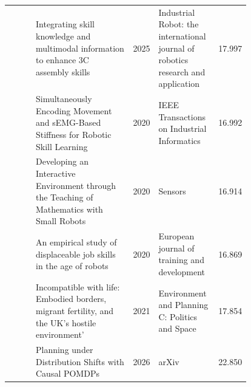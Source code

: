 \documentclass{article}
\begin{document}
\begin{center}
\begin{longtable}{p{0.12\linewidth}p{0.42\linewidth}cp{0.25\linewidth}c}
\citep{pool83_23} & Integrating skill knowledge and multimodal information to enhance 3C assembly skills & 2025 & Industrial Robot: the international journal of robotics research and application & 17.997\\
\citep{pool83_24} & Simultaneously Encoding Movement and sEMG-Based Stiffness for Robotic Skill Learning & 2020 & IEEE Transactions on Industrial Informatics & 16.992\\
\citep{pool83_25} & Developing an Interactive Environment through the Teaching of Mathematics with Small Robots & 2020 & Sensors & 16.914\\
\citep{pool83_26} & An empirical study of displaceable job skills in the age of robots & 2020 & European journal of training and development & 16.869\\
\citep{pool83_27} & Incompatible with life: Embodied borders, migrant fertility, and the UK's hostile environment' & 2021 & Environment and Planning C: Politics and Space & 17.854\\
\citep{pool83_28} & Planning under Distribution Shifts with Causal POMDPs & 2026 & arXiv & 22.850\\
\bottomrule
\end{longtable}
\normalsize
\end{center}




\end{document}
